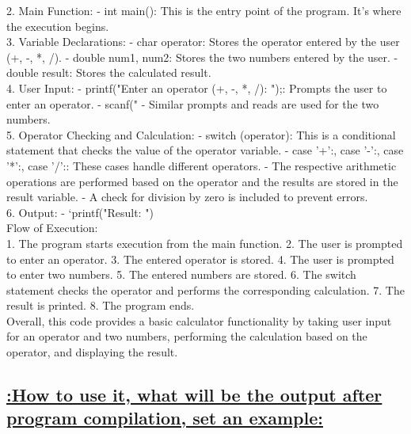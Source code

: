 \documentclass[a4paper,12pt]{article}
\begin{document}
2. Main Function:
   - int main(): This is the entry point of the program. It's where the execution begins.\\

3. Variable Declarations:
   - char operator: Stores the operator entered by the user (+, -, *, /).
   - double num1, num2: Stores the two numbers entered by the user.
   - double result: Stores the calculated result.\\

4. User Input:
   - printf("Enter an operator (+, -, *, /): ");: Prompts the user to enter an operator.
   - scanf("%
   - Similar prompts and reads are used for the two numbers.\\

5. Operator Checking and Calculation:
   - switch (operator): This is a conditional statement that checks the value of the operator variable.
   - case '+':, case '-':, case '*':, case '/':: These cases handle different operators.
   - The respective arithmetic operations are performed based on the operator and the results are stored in the result variable.
   - A check for division by zero is included to prevent errors.\\

6. Output:
   - `printf("Result: ")\\

Flow of Execution:\\

1. The program starts execution from the main function.
2. The user is prompted to enter an operator.
3. The entered operator is stored.
4. The user is prompted to enter two numbers.
5. The entered numbers are stored.
6. The switch statement checks the operator and performs the corresponding calculation.
7. The result is printed.
8. The program ends.\\
Overall, this code provides a basic calculator functionality by taking user input for an operator and two numbers, performing the calculation based on the operator, and displaying the result.

\begin{center}
\section*{\uline{:How to use it, what will be the output after program compilation, set an example:}}
\end{center}
\end{document}
